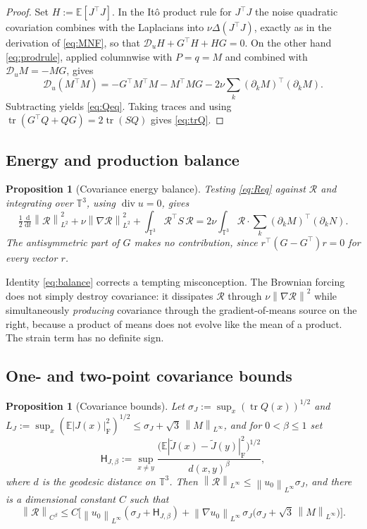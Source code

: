 \documentclass[11pt,reqno]{amsart}
\newcommand{\T}{\mathbb{T}}
\newcommand{\E}{\mathbb{E}}
\newcommand{\dd}{\,\mathrm{d}}
\newcommand{\norm}[1]{\left\lVert #1\right\rVert}
\newcommand{\abs}[1]{\left\lvert #1\right\rvert}
\DeclareMathOperator{\diver}{div}
\DeclareMathOperator{\tr}{tr}
\newtheorem{proposition}[theorem]{Proposition}
\theoremstyle{definition}
\begin{document}
\begin{proof}
Set $H:=\E[J^\top J]$. In the It\^o product rule for $J^\top J$ the noise quadratic
covariation combines with the Laplacians into $\nu\Delta(J^\top J)$, exactly as in the
derivation of \eqref{eq:MNF}, so that $\mathcal D_uH+G^\top H+HG=0$. On the other hand
\eqref{eq:prodrule}, applied columnwise with $P=q=M$ and combined with
$\mathcal D_uM=-MG$, gives
\[
  \mathcal D_u(M^\top M)=-G^\top M^\top M-M^\top MG
  -2\nu\sum_k(\partial_kM)^\top(\partial_kM).
\]
Subtracting yields \eqref{eq:Qeq}. Taking traces and using
$\tr(G^\top Q+QG)=2\tr(SQ)$ gives \eqref{eq:trQ}.
\end{proof}

\subsection{Energy and production balance}

\begin{proposition}[Covariance energy balance]\label{prop:balance}
Testing \eqref{eq:Req} against $\mathcal R$ and integrating over $\T^3$, using
$\diver u=0$, gives
\begin{equation}\label{eq:balance}
  \tfrac12\tfrac{\dd}{\dd t}\norm{\mathcal R}_{L^2}^2
  +\nu\norm{\nabla\mathcal R}_{L^2}^2
  +\int_{\T^3}\mathcal R^\top S\,\mathcal R
  =2\nu\int_{\T^3}\mathcal R\cdot\sum_k(\partial_kM)^\top(\partial_kN).
\end{equation}
The antisymmetric part of $G$ makes no contribution, since
$r^\top(G-G^\top)r=0$ for every vector $r$.
\end{proposition}

Identity \eqref{eq:balance} corrects a tempting misconception. The Brownian forcing does
not simply destroy covariance: it dissipates $\mathcal R$ through
$\nu\norm{\nabla\mathcal R}^2$ while simultaneously \emph{producing} covariance through
the gradient-of-means source on the right, because a product of means does not evolve like
the mean of a product. The strain term has no definite sign.

\subsection{One- and two-point covariance bounds}

\begin{proposition}[Covariance bounds]\label{prop:covbounds}
Let $\sigma_J:=\sup_x(\tr Q(x))^{1/2}$ and
$L_J:=\sup_x(\E\abs{J(x)}_{\mathrm F}^2)^{1/2}\le\sigma_J+\sqrt3\,\norm M_{L^\infty}$, and
for $0<\beta\le1$ set
\[
  \mathsf H_{J,\beta}:=\sup_{x\ne y}
  \frac{\bigl(\E\abs{\widetilde J(x)-\widetilde J(y)}_{\mathrm F}^2\bigr)^{1/2}}{d(x,y)^\beta},
\]
where $d$ is the geodesic distance on $\T^3$. Then
$\norm{\mathcal R}_{L^\infty}\le\norm{u_0}_{L^\infty}\sigma_J$, and there is a dimensional
constant $C$ such that
\begin{equation}\label{eq:Rholder}
  \norm{\mathcal R}_{C^\beta}\le C\Big[
  \norm{u_0}_{L^\infty}(\sigma_J+\mathsf H_{J,\beta})
  +\norm{\nabla u_0}_{L^\infty}\,\sigma_J\bigl(\sigma_J+\sqrt3\,\norm M_{L^\infty}\bigr)\Big].
\end{equation}
\end{proposition}
\end{document}
